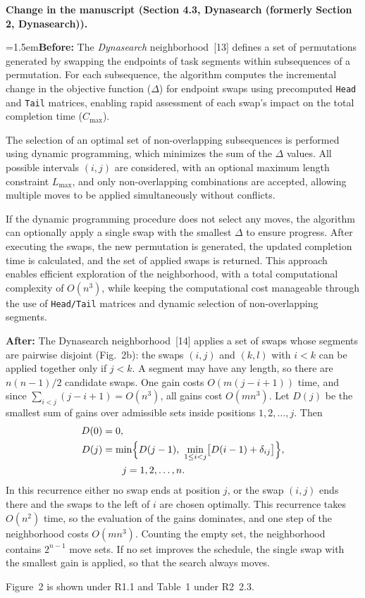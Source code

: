 \documentclass[12pt]{article}
\newcommand{\change}[3]{\par\smallskip\noindent\textbf{Change in the manuscript (#1).}\par
  {\leftskip=1.5em\noindent\textbf{Before:} #2\par\noindent\textbf{After:} #3\par}}
\begin{document}
\change{Section 4.3, Dynasearch (formerly Section 2, Dynasearch)}{The \emph{Dynasearch} neighborhood~[13] defines a set of permutations generated by swapping the endpoints of task segments within subsequences of a permutation. For each subsequence, the algorithm computes the incremental change in the objective function ($\Delta$) for endpoint swaps using precomputed \texttt{Head} and \texttt{Tail} matrices, enabling rapid assessment of each swap's impact on the total completion time ($C_{\max}$).

The selection of an optimal set of non-overlapping subsequences is performed using dynamic programming, which minimizes the sum of the $\Delta$ values. All possible intervals $(i,j)$ are considered, with an optional maximum length constraint $L_{\max}$, and only non-overlapping combinations are accepted, allowing multiple moves to be applied simultaneously without conflicts.

If the dynamic programming procedure does not select any moves, the algorithm can optionally apply a single swap with the smallest $\Delta$ to ensure progress. After executing the swaps, the new permutation is generated, the updated completion time is calculated, and the set of applied swaps is returned. This approach enables efficient exploration of the neighborhood, with a total computational complexity of $O(n^3)$, while keeping the computational cost manageable through the use of \texttt{Head/Tail} matrices and dynamic selection of non-overlapping segments.}{The Dynasearch neighborhood~[14] applies a set of swaps whose segments are pairwise disjoint (Fig.~2b): the swaps $(i,j)$ and $(k,l)$ with $i<k$ can be applied together only if $j<k$. A segment may have any length, so there are $n(n-1)/2$ candidate swaps. One gain costs $O(m(j-i+1))$ time, and since $\sum_{i<j}(j-i+1)=O(n^3)$, all gains cost $O(mn^3)$. Let $D(j)$ be the smallest sum of gains over admissible sets inside positions $1,2,\dots,j$. Then
\begin{equation}
\begin{aligned}
D(0)&=0,\\
D(j)&=\min\Bigl\{D(j-1),\ \min_{1\le i<j}\bigl[D(i-1)+\delta_{ij}\bigr]\Bigr\},\\
&\qquad j=1,2,\dots,n.
\end{aligned}
\end{equation}
In this recurrence either no swap ends at position $j$, or the swap $(i,j)$ ends there and the swaps to the left of $i$ are chosen optimally. This recurrence takes $O(n^2)$ time, so the evaluation of the gains dominates, and one step of the neighborhood costs $O(mn^3)$. Counting the empty set, the neighborhood contains $2^{n-1}$ move sets. If no set improves the schedule, the single swap with the smallest gain is applied, so that the search always moves.}
Figure~2 is shown under R1.1 and Table~1 under R2~2.3.
\end{document}
